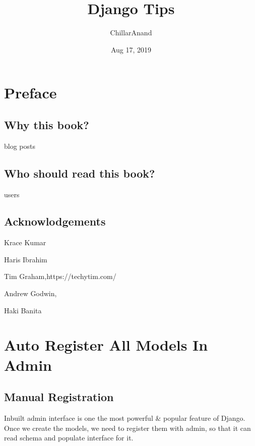 \documentclass[letterpaper,11pt,english]{sphinxmanual}
\title{Django Tips}
\date{Aug 17, 2019}
\author{ChillarAnand}
\begin{document}
\pagestyle{empty}
\sphinxmaketitle
\pagestyle{plain}
\sphinxtableofcontents
\pagestyle{normal}
\label{\detokenize{index::doc}}



\chapter{Preface}
\label{\detokenize{preface:preface}}\label{\detokenize{preface::doc}}

\section{Why this book?}
\label{\detokenize{preface:why-this-book}}
blog posts


\section{Who should read this book?}
\label{\detokenize{preface:who-should-read-this-book}}
users


\section{Acknowlodgements}
\label{\detokenize{preface:acknowlodgements}}
Krace Kumar

Haris Ibrahim

Tim Graham,https://techytim.com/

Andrew Godwin, 

Haki Banita



\chapter{Auto Register All Models In Admin}
\label{\detokenize{admin_auto_register_models:auto-register-all-models-in-admin}}\label{\detokenize{admin_auto_register_models::doc}}

\section{Manual Registration}
\label{\detokenize{admin_auto_register_models:manual-registration}}
Inbuilt admin interface is one the most powerful \& popular feature of Django. Once we create the models, we need to register them with admin, so that it can read schema and populate interface for it.
\end{document}
